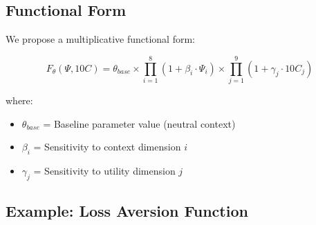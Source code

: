 \subsection{Functional Form}

We propose a multiplicative functional form:

\begin{equation}
F_\theta(\Psi, 10C) = \theta_{base} \times \prod_{i=1}^{8} (1 + \beta_i \cdot \Psi_i) \times \prod_{j=1}^{9} (1 + \gamma_j \cdot 10C_j)
\label{eq:context-function-form}
\end{equation}

where:
\begin{itemize}
    \item $\theta_{base}$ = Baseline parameter value (neutral context)
    \item $\beta_i$ = Sensitivity to context dimension $i$
    \item $\gamma_j$ = Sensitivity to utility dimension $j$
\end{itemize}

\subsection{Example: Loss Aversion Function}


